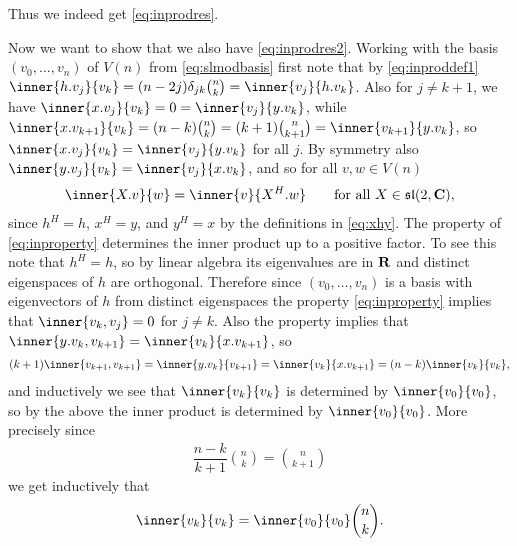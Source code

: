 Thus we indeed get \cref{eq:inprodres}.

Now we want to show that we also have \cref{eq:inprodres2}. Working with the basis $(v_0,\dotsc,v_n)$ of $V(n)$ from \cref{eq:slmodbasis} first note that by \cref{eq:inproddef1} $\inner{h.v_j}{v_k}=(n-2j)\delta_{jk}\binom{n}{k}=\inner{v_j}{h.v_k}$. Also for $j\neq k+1$, we have $\inner{x.v_j}{v_k}=0=\inner{v_j}{y.v_k}$, while $\inner{x.v_{k+1}}{v_k}=(n-k)\binom{n}{k}=(k+1)\binom{n}{k+1}=\inner{v_{k+1}}{y.v_k}$, so $\inner{x.v_j}{v_k}=\inner{v_j}{y.v_k}$ for all $j$. By symmetry also $\inner{y.v_j}{v_k}=\inner{v_j}{x.v_k}$, and so for all $v,w\in V(n)$
\begin{align}\label{eq:inproperty}
  \inner{X.v}{w} = \inner{v}{X^H.w} \qquad \mbox{for all $X\in\slc$},
\end{align}
since $h^H=h$, $x^H=y$, and $y^H=x$ by the definitions in \cref{eq:xhy}. The property of \cref{eq:inproperty} determines the inner product up to a positive factor. To see this note that $h^H=h$, so by linear algebra its eigenvalues are in $\mathbf{R}$ and distinct eigenspaces of $h$ are orthogonal. Therefore since $(v_0,\dotsc,v_n)$ is a basis with eigenvectors of $h$ from distinct eigenspaces the property \cref{eq:inproperty} implies that $\inner{v_k,v_j}=0$ for $j\neq k$. Also the property implies that $\inner{y.v_k,v_{k+1}}=\inner{v_k}{x.v_{k+1}}$, so
\begin{align*}
  (k+1)\inner{v_{k+1},v_{k+1}} = \inner{y.v_k}{v_{k+1}} = \inner{v_k}{x.v_{k+1}} = (n-k)\inner{v_k}{v_k},
\end{align*}
and inductively we see that $\inner{v_k}{v_k}$ is determined by $\inner{v_0}{v_0}$, so by the above the inner product is determined by $\inner{v_0}{v_0}$. More precisely since 
\begin{align*}
  \dfrac{n-k}{k+1}\binom{n}{k} = \binom{n}{k+1}
\end{align*}
we get inductively that
\begin{align*}
  \inner{v_k}{v_k} = \inner{v_0}{v_0}\binom{n}{k}.
\end{align*}

